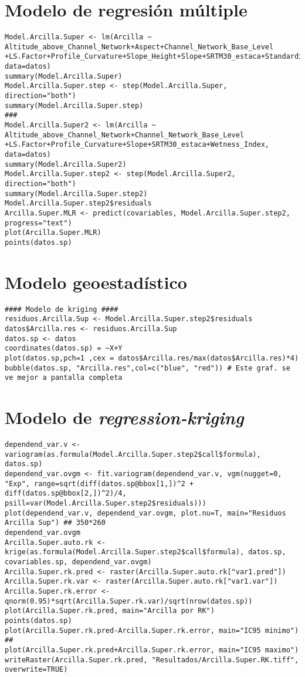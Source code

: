\documentclass[10pt,a4paper]{article}
\begin{document}
\section{Modelo de regresión múltiple}
\begin{lstlisting}
Model.Arcilla.Super <- lm(Arcilla ~ Altitude_above_Channel_Network+Aspect+Channel_Network_Base_Level
+LS.Factor+Profile_Curvature+Slope_Height+Slope+SRTM30_estaca+Standardized_Height+Valley_Depth+Wetness_Index, data=datos)
summary(Model.Arcilla.Super)
Model.Arcilla.Super.step <- step(Model.Arcilla.Super, direction="both")
summary(Model.Arcilla.Super.step)
###
Model.Arcilla.Super2 <- lm(Arcilla ~ Altitude_above_Channel_Network+Channel_Network_Base_Level
+LS.Factor+Profile_Curvature+Slope+SRTM30_estaca+Wetness_Index, data=datos)
summary(Model.Arcilla.Super2)
Model.Arcilla.Super.step2 <- step(Model.Arcilla.Super2, direction="both")
summary(Model.Arcilla.Super.step2)
Model.Arcilla.Super.step2$residuals
Arcilla.Super.MLR <- predict(covariables, Model.Arcilla.Super.step2, progress="text")
plot(Arcilla.Super.MLR)
points(datos.sp)
\end{lstlisting}

\section{Modelo geoestadístico}
\begin{lstlisting}
#### Modelo de kriging ####
residuos.Arcilla.Sup <- Model.Arcilla.Super.step2$residuals
datos$Arcilla.res <- residuos.Arcilla.Sup
datos.sp <- datos
coordinates(datos.sp) = ~X+Y
plot(datos.sp,pch=1 ,cex = datos$Arcilla.res/max(datos$Arcilla.res)*4)
bubble(datos.sp, "Arcilla.res",col=c("blue", "red")) # Este graf. se ve mejor a pantalla completa
\end{lstlisting}

\section{Modelo de \textit{regression-kriging}}
\begin{lstlisting}
dependend_var.v <- variogram(as.formula(Model.Arcilla.Super.step2$call$formula), datos.sp)
dependend_var.ovgm <- fit.variogram(dependend_var.v, vgm(nugget=0, "Exp", range=sqrt(diff(datos.sp@bbox[1,])^2 + diff(datos.sp@bbox[2,])^2)/4, psill=var(Model.Arcilla.Super.step2$residuals)))
plot(dependend_var.v, dependend_var.ovgm, plot.nu=T, main="Residuos Arcilla Sup") ## 350*260
dependend_var.ovgm
Arcilla.Super.auto.rk <- krige(as.formula(Model.Arcilla.Super.step2$call$formula), datos.sp, covariables.sp, dependend_var.ovgm)
Arcilla.Super.rk.pred <- raster(Arcilla.Super.auto.rk["var1.pred"])
Arcilla.Super.rk.var <- raster(Arcilla.Super.auto.rk["var1.var"])
Arcilla.Super.rk.error <- qnorm(0.95)*sqrt(Arcilla.Super.rk.var)/sqrt(nrow(datos.sp))
plot(Arcilla.Super.rk.pred, main="Arcilla por RK")
points(datos.sp)
plot(Arcilla.Super.rk.pred-Arcilla.Super.rk.error, main="IC95 minimo") ## 
plot(Arcilla.Super.rk.pred+Arcilla.Super.rk.error, main="IC95 maximo")
writeRaster(Arcilla.Super.rk.pred, "Resultados/Arcilla.Super.RK.tiff", overwrite=TRUE)
\end{lstlisting}
\end{document}
